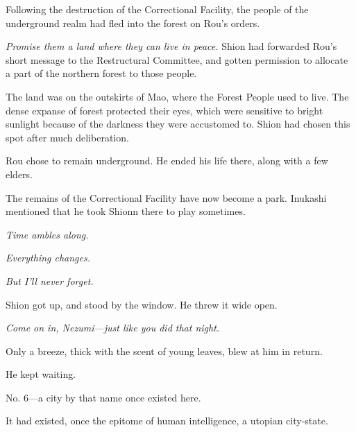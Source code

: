 
Following the destruction of the Correctional Facility, the people of
the underground realm had fled into the forest on Rou's orders.

\emph{Promise them a land where they can live in peace.} Shion had forwarded
Rou's short message to the Restructural Committee, and gotten permission
to allocate a part of the northern forest to those people.

The land was on the outskirts of Mao, where the Forest People used to
live. The dense expanse of forest protected their eyes, which were
sensitive to bright sunlight because of the darkness they were
accustomed to. Shion had chosen this spot after much deliberation.

Rou chose to remain underground. He ended his life there, along with a
few elders.

The remains of the Correctional Facility have now become a park.
Inukashi mentioned that he took Shionn there to play sometimes.

\emph{Time ambles along.}

\emph{Everything changes.}

\emph{But I'll never forget.}

Shion got up, and stood by the window. He threw it wide open.

\emph{Come on in, Nezumi---just like you did that night.}

Only a breeze, thick with the scent of young leaves, blew at him in
return.

He kept waiting.

\mybreak

No. 6---a city by that name once existed here.

It had existed, once the epitome of human intelligence, a utopian
city-state.